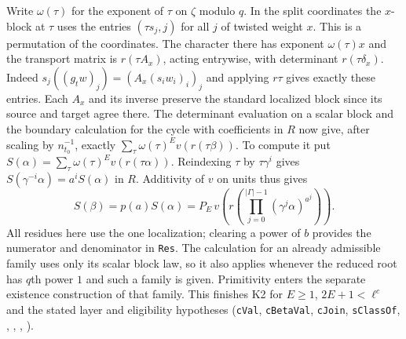 Write $\omega(\tau)$ for the exponent of $\tau$ on $\zeta$ modulo
$q$. In the split coordinates the $x$-block at $\tau$ uses the entries
$(\tau s_j,j)$ for all $j$ of twisted weight $x$. This is a
permutation of the coordinates. The character there has exponent
$\omega(\tau)x$ and the transport matrix is $r(\tau A_x)$, acting
entrywise, with determinant $r(\tau\delta_x)$.
Indeed $s_j((g_tw)_j)=(A_x(s_iw_i)_i)_j$ and applying $r\tau$ gives
exactly these entries. Each $A_x$ and its inverse preserve the standard
localized block since its source and target agree there.
The determinant evaluation on a scalar block and the boundary
calculation for the cycle with coefficients in $R$ now give, after scaling by
$n_{t_0}^{-1}$, exactly $\sum_\tau\omega(\tau)^E v(r(\tau\beta))$.
To compute it put $S(\alpha)=\sum_\tau\omega(\tau)^Ev(r(\tau\alpha))$.
Reindexing $\tau$ by $\tau\gamma^i$ gives
$S(\gamma^{-i}\alpha)=a^i S(\alpha)$ in $R$.
Additivity of $v$ on units thus gives
\[
 S(\beta)=p(a)S(\alpha)
 =P_E\,v\!\left(r\!\left(\prod_{j=0}^{|\Gamma|-1}
                       (\gamma^j\alpha)^{a^j}\right)\right).
\]
All residues here use the one localization; clearing a power of $b$
provides the numerator and denominator in \nolinkurl{Res}. The
calculation for an already admissible family uses only its scalar
block law, so it also applies whenever the reduced root has $q$th
power $1$ and such a family is given. Primitivity enters the separate
existence construction of that family.
This finishes K2 for $E\ge1$, $2E+1<\ell^c$ and the stated layer
and eligibility hypotheses
(\nolinkurl{cVal}, \nolinkurl{cBetaVal}, \nolinkurl{cJoin},
\nolinkurl{sClassOf}, ,
,
,
).

